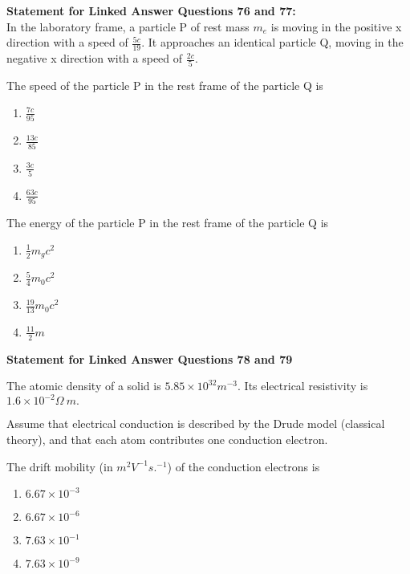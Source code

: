 \textbf{Statement for Linked Answer Questions 76 and 77:}\\
In the laboratory frame, a particle P of rest mass $m_e$ is moving in the positive x direction with a speed of $\frac{5c}{19}$. It approaches an identical particle Q, moving in the negative x direction with a speed of $\frac{2c}{5}$.


\item The speed of the particle P in the rest frame of the particle Q is
\begin{multicols}{4}
\begin{enumerate}
\item $\frac{7c}{95}$
\item $\frac{13c}{85}$
\item $\frac{3c}{5}$
\item $\frac{63c}{95}$
\end{enumerate}
\end{multicols}


\item The energy of the particle P in the rest frame of the particle Q is
\begin{multicols}{4}
\begin{enumerate}
\item $\frac{1}{2}m_{g}c^{2}$
\item $\frac{5}{4}m_{0}c^{2}$
\item $\frac{19}{13}m_{0}c^{2}$
\item $\frac{11}{2}m$
\end{enumerate}
\end{multicols}
    \textbf{Statement for Linked Answer Questions 78 and 79}

The atomic density of a solid is $5.85\times10^{32}m^{-3}$. Its electrical resistivity is $1.6\times10^{-2}\Omega~m.$

Assume that electrical conduction is described by the Drude model (classical theory), and that each atom contributes one conduction electron.


\item The drift mobility (in $m^{2}V^{-1}s.^{-1}$) of the conduction electrons is
\begin{multicols}{4}
\begin{enumerate}
\item $6.67\times10^{-3}$
\item $6.67\times10^{-6}$
\item $7.63\times10^{-1}$
\item $7.63\times10^{-9}$
\end{enumerate}
\end{multicols}

